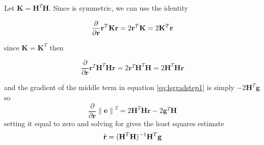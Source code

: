 Let $\mathbf{K} = \mathbf{H}^T \mathbf{H}$. Since  is symmetric, we can use the identity

\begin{equation}
\dfrac {\partial } {\partial \mathbf{r} }  \mathbf{r}^{T} \mathbf{K} \mathbf{r} = 2 \mathbf{r}^T \mathbf{K} = 2 \mathbf{K}^T \mathbf{r}
\end{equation}

since $\mathbf{K}=\mathbf{K}^T$ then 

\begin{equation}
\dfrac {\partial } {\partial \mathbf{r} }  \mathbf{r}^{T} \mathbf{H}^{T} \mathbf{H} \mathbf{r}  = 2 \mathbf{r}^T \mathbf{H}^T \mathbf{H} = 2 \mathbf{H}^T \mathbf{H} \mathbf{r}
\end{equation}



and the gradient of the middle term in equation \ref{eq:lsgradstep1} is simply $- 2 \mathbf{H}^{T} \mathbf{g}$ so 
\begin{equation}
\dfrac {\partial } {\partial \mathbf{r} } \mathbf{ \lVert \mathbf{e} \rVert }^2  = 2 \mathbf{H}^T \mathbf{H} \mathbf{r} - 2 \mathbf{g}^{T} \mathbf{H}
\end{equation}
setting it equal to zero and solving for  gives the least squares estimate
\begin{equation}
	\hat{ \mathbf{r} } = ( \mathbf{H}^T \mathbf{H} )^{-1} \mathbf{H}^T \mathbf{g}
\end{equation}